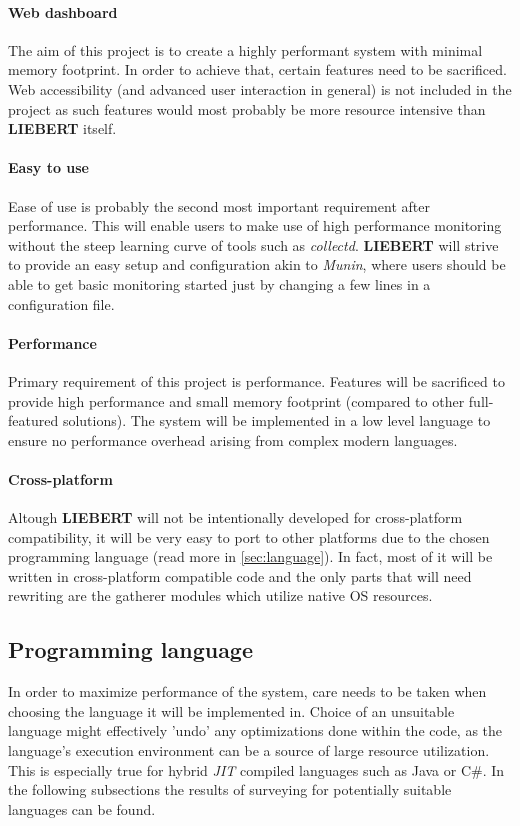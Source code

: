 \documentclass[12pt,a4paper,table]{article}
\begin{document}
                \paragraph{Web dashboard}
                    The aim of this project is to create a highly performant system with minimal memory footprint. In order to achieve that, certain features need to be sacrificed. Web accessibility (and advanced user interaction in general) is not included in the project as such features would most probably be more resource intensive than \textbf{LIEBERT} itself.

                \paragraph{Easy to use}
                    Ease of use is probably the second most important requirement after performance. This will enable users to make use of high performance monitoring without the steep learning curve of tools such as \textit{collectd}. \textbf{LIEBERT} will strive to provide an easy setup and configuration akin to \textit{Munin}, where users should be able to get basic monitoring started just by changing a few lines in a configuration file.

                \paragraph{Performance}
                    Primary requirement of this project is performance. Features will be sacrificed to provide high performance and small memory footprint (compared to other full-featured solutions). The system will be implemented in a low level language to ensure no performance overhead arising from complex modern languages.

                \paragraph{Cross-platform}
                    Altough \textbf{LIEBERT} will not be intentionally developed for cross-platform compatibility, it will be very easy to port to other platforms due to the chosen programming language (read more in \autoref{sec:language}). In fact, most of it will be written in cross-platform compatible code and the only parts that will need rewriting are the gatherer modules which utilize native OS resources.

        \subsection{Programming language}\label{sec:language}
            In order to maximize performance of the system, care needs to be taken when choosing the language it will be implemented in. Choice of an unsuitable language might effectively 'undo' any optimizations done within the code, as the language's execution environment can be a source of large resource utilization. This is especially true for hybrid \textit{JIT} compiled languages such as Java or C\#. In the following subsections the results of surveying for potentially suitable languages can be found.
\end{document}
